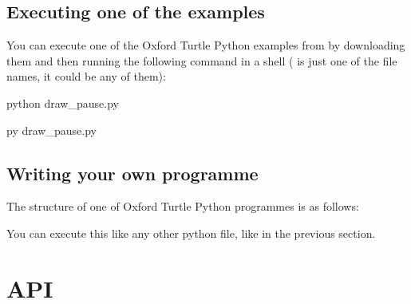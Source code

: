 \documentclass[letterpaper,10pt,english]{sphinxmanual}
\begin{document}
\section{Executing one of the examples}
\label{\detokenize{usage:executing-one-of-the-examples}}
\sphinxAtStartPar
You can execute one of the Oxford Turtle Python examples from  by downloading them
and then running the following command in a shell ( is just one of the file names, it could be any of them):
\begin{description}
\sphinxAtStartPar
python draw\_pause.py

\sphinxAtStartPar
py draw\_pause.py

\end{description}


\section{Writing your own programme}
\label{\detokenize{usage:writing-your-own-programme}}
\sphinxAtStartPar
The structure of one of Oxford Turtle Python programmes is as follows:

\begin{sphinxVerbatim}[commandchars=\\\{\}]
     
              

       
     
\end{sphinxVerbatim}

\sphinxAtStartPar
You can execute this like any other python file, like in the previous section.

\sphinxstepscope


\chapter{API}
\label{\detokenize{api:api}}\label{\detokenize{api::doc}}
\end{document}
